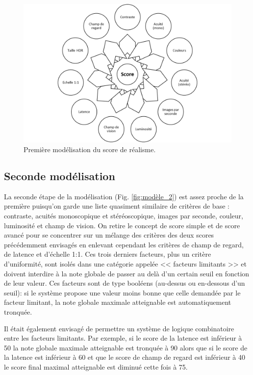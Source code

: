 	\begin{figure}
		\centering
		\includegraphics[scale=.8]{Figures/Modele1_2}
		\caption{Première modélisation du score de réalisme.}
		\label{fig:modèle_1}
	\end{figure}
	
	\subsection{Seconde modélisation}
	\par La seconde étape de la modélisation  (Fig. \ref{fig:modèle_2}) est assez proche de la première puisqu'on garde une liste quasiment similaire de critères de base : contraste, acuités monoscopique et stéréoscopique, images par seconde, couleur, luminosité et champ de vision. On retire le concept de score simple et de score avancé pour se concentrer sur un mélange des critères des deux scores précédemment envisagés en enlevant cependant les critères de champ de regard, de latence et d'échelle 1:1. Ces trois derniers facteurs, plus un critère d'uniformité, sont isolés dans une catégorie appelée << facteurs limitants >> et doivent interdire à la note globale de passer au delà d'un certain seuil en fonction de leur valeur. Ces facteurs sont de type booléens (au-dessus ou en-dessous d'un seuil): si le système propose une valeur moins bonne que celle demandée par le facteur limitant, la note globale maximale atteignable est automatiquement tronquée.
	
	\par Il était également envisagé de permettre un système de logique combinatoire entre les facteurs limitants. Par exemple, si le score de la latence est inférieur à 50 la note globale maximale atteignable est tronquée à 90 alors que si le score de la latence est inférieur à 60 et que le score de champ de regard est inférieur à 40 le score final maximal atteignable est diminué cette fois à 75.
	
